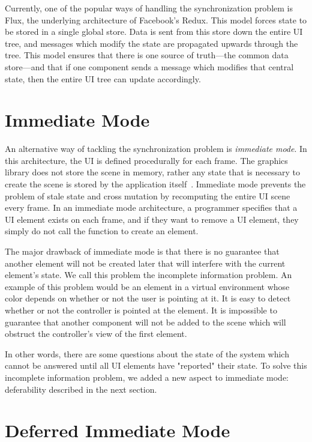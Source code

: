 \documentclass[conference,12pt]{IEEEtran}
\begin{document}
Currently, one of the popular ways of handling the synchronization problem is
Flux, the underlying architecture of Facebook's Redux. This model forces state
to be stored in a single global store. Data is sent from this store down the
entire UI tree, and messages which modify the state are propagated upwards
through the tree. This model ensures that there is one source of truth---the
common data store---and that if one component sends a message which modifies
that central state, then the entire UI tree can update accordingly.

\section{Immediate Mode}\label{sec:immediate-mode}

An alternative way of tackling the synchronization problem is \textit{immediate
mode}.  In this architecture, the UI is defined procedurally for each frame. The
graphics library does not store the scene in memory, rather any state that is
necessary to create the scene is stored by the application
itself~\cite{Microsoft:Retained-vs-Immediate}. Immediate mode prevents the
problem of stale state and cross mutation by recomputing the entire UI scene
every frame. In an immediate mode architecture, a programmer specifies that a UI
element exists on each frame, and if they want to remove a UI element, they
simply do not call the function to create an element.

The major drawback of immediate mode is that there is no guarantee that another
element will not be created later that will interfere with the current element's
state. We call this problem the incomplete information problem. An example of
this problem would be an element in a virtual environment whose color depends on
whether or not the user is pointing at it. It is easy to detect whether or not
the controller is pointed at the element. It is impossible to guarantee that
another component will not be added to the scene which will obstruct the
controller's view of the first element.

In other words, there are some questions about the state of the system which
cannot be answered until all UI elements have "reported" their state.  To solve
this incomplete information problem, we added a new aspect to immediate mode:
deferability described in the next section.

\section{Deferred Immediate Mode}\label{sec:dim}
\end{document}
